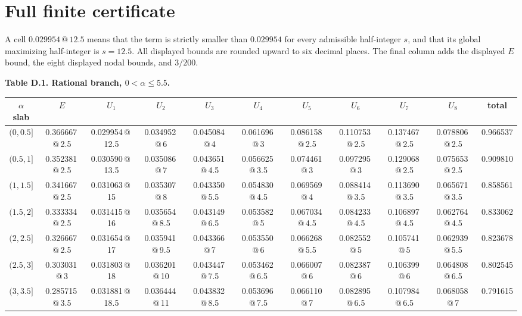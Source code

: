 \documentclass[11pt]{amsart}
\theoremstyle{definition}
\begin{document}
\section{Full finite certificate}\label{app:full-certificate}

A cell $0.029954\,@\,12.5$ means that the term is strictly smaller than $0.029954$ for every admissible half-integer $s$, and that its global maximizing half-integer is $s=12.5$.  All displayed bounds are rounded upward to six decimal places.  The final column adds the displayed $E$ bound, the eight displayed nodal bounds, and $3/200$.

\begin{landscape}
\scriptsize
\setlength{\tabcolsep}{2.8pt}
\renewcommand{\arraystretch}{1.08}
\begin{center}
\textbf{Table D.1. Rational branch, $0<\alpha\le5.5$.}\par\medskip
\begin{tabular}{c|c|cccccccc|c}
\toprule
$\alpha$ slab & $E$ & $U_1$ & $U_2$ & $U_3$ & $U_4$ & $U_5$ & $U_6$ & $U_7$ & $U_8$ & total\\
\midrule
$(0,0.5]$ & 0.366667\,@\,2.5 & 0.029954\,@\,12.5 & 0.034952\,@\,6 & 0.045084\,@\,4 & 0.061696\,@\,3 & 0.086158\,@\,2.5 & 0.110753\,@\,2.5 & 0.137467\,@\,2.5 & 0.078806\,@\,2.5 & 0.966537 \\
$(0.5,1]$ & 0.352381\,@\,2.5 & 0.030590\,@\,13.5 & 0.035086\,@\,7 & 0.043651\,@\,4.5 & 0.056625\,@\,3.5 & 0.074461\,@\,3 & 0.097295\,@\,3 & 0.129068\,@\,2.5 & 0.075653\,@\,2.5 & 0.909810 \\
$(1,1.5]$ & 0.341667\,@\,2.5 & 0.031063\,@\,15 & 0.035307\,@\,8 & 0.043350\,@\,5.5 & 0.054830\,@\,4.5 & 0.069569\,@\,4 & 0.088414\,@\,3.5 & 0.113690\,@\,3.5 & 0.065671\,@\,3.5 & 0.858561 \\
$(1.5,2]$ & 0.333334\,@\,2.5 & 0.031415\,@\,16 & 0.035654\,@\,8.5 & 0.043149\,@\,6.5 & 0.053582\,@\,5 & 0.067034\,@\,4.5 & 0.084233\,@\,4.5 & 0.106897\,@\,4.5 & 0.062764\,@\,4.5 & 0.833062 \\
$(2,2.5]$ & 0.326667\,@\,2.5 & 0.031654\,@\,17 & 0.035941\,@\,9.5 & 0.043366\,@\,7 & 0.053550\,@\,6 & 0.066268\,@\,5.5 & 0.082552\,@\,5 & 0.105741\,@\,5 & 0.062939\,@\,5.5 & 0.823678 \\
$(2.5,3]$ & 0.303031\,@\,3 & 0.031803\,@\,18 & 0.036201\,@\,10 & 0.043447\,@\,7.5 & 0.053462\,@\,6.5 & 0.066007\,@\,6 & 0.082387\,@\,6 & 0.106399\,@\,6 & 0.064808\,@\,6.5 & 0.802545 \\
$(3,3.5]$ & 0.285715\,@\,3.5 & 0.031881\,@\,18.5 & 0.036444\,@\,11 & 0.043832\,@\,8.5 & 0.053696\,@\,7.5 & 0.066110\,@\,7 & 0.082895\,@\,6.5 & 0.107984\,@\,6.5 & 0.068058\,@\,7 & 0.791615 \\

\end{tabular}
\end{center}
\end{landscape}
\end{document}
